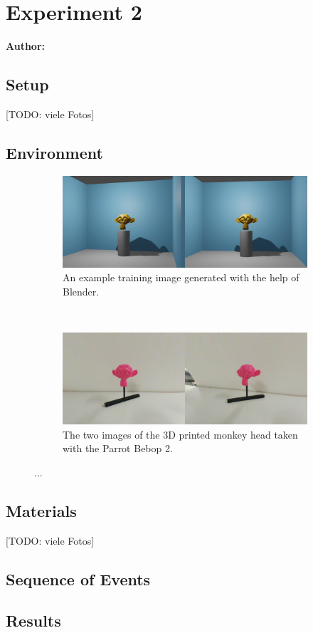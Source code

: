 \chapter{Experiment 2}

\textbf{Author: } 


\section{Setup}
[TODO: viele Fotos]

\section{Environment}

\begin{figure}[h!]
	\centering
	\begin{subfigure}[t]{\textwidth}
		\centering
		\includegraphics[width=\textwidth]{img/experiment2_environment_comparison_2.jpg}
		\caption{An example training image generated with the help of Blender.}
	\end{subfigure}
	~ 
	\begin{subfigure}[t]{\textwidth}
		\centering
		\includegraphics[width=\textwidth]{img/experiment2_environment_comparison_1.jpg}
		\caption{The two images of the 3D printed monkey head taken with the Parrot Bebop 2.}
	\end{subfigure}
	\caption{...}
	\label{pic:experiment2_environment_comparison}
\end{figure}


\section{Materials}
[TODO: viele Fotos]

\section{Sequence of Events}

\section{Results}

\filbreak